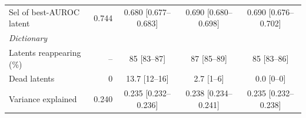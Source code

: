 \begin{tabular*}{\linewidth}{@{\extracolsep{\fill}}lrccc@{}}
\quad Sel of best-AUROC latent & 0.744 & 0.680 [0.677--0.683] & 0.690 [0.680--0.698] & 0.690 [0.676--0.702] \\
\multicolumn{5}{l}{\textit{Dictionary}} \\
\quad Latents reappearing (\%) & -- & 85 [83--87] & 87 [85--89] & 85 [83--86] \\
\quad Dead latents & 0 & 13.7 [12--16] & 2.7 [1--6] & 0.0 [0--0] \\
\quad Variance explained & 0.240 & 0.235 [0.232--0.236] & 0.238 [0.234--0.241] & 0.235 [0.232--0.238] \\
\bottomrule
\end{tabular*}
